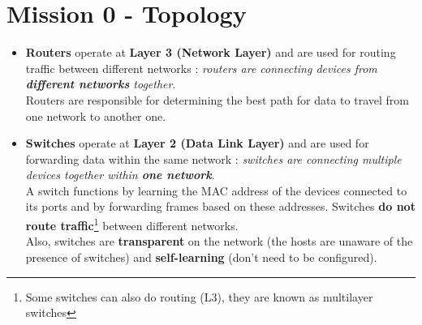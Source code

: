 \documentclass[10pt,a4paper]{ULBreport}
\begin{document}
 



\chapter{Mission 0 - Topology}





\begin{itemize}
    \item \textbf{Routers} operate at \textbf{Layer 3 (Network Layer)} and are used for routing traffic between different networks : \textit{routers are connecting devices from \textbf{different networks} together}. \\ Routers are responsible for determining the best path for data to travel from one network to another one.
    \item \textbf{Switches} operate at \textbf{Layer 2 (Data Link Layer)} and are used for forwarding data within the same network : \textit{switches are connecting multiple devices together within \textbf{one network}}. \\ A switch functions by learning the MAC address of the devices connected to its ports and by forwarding frames based on these addresses. Switches \textbf{do not route traffic}\footnote{Some switches can also do routing (L3), they are known as multilayer switches} between different networks. \\ Also, switches are \textbf{transparent} on the network (the hosts are unaware of the presence of switches) and \textbf{self-learning} (don't need to be configured).
\end{itemize}
\end{document}
